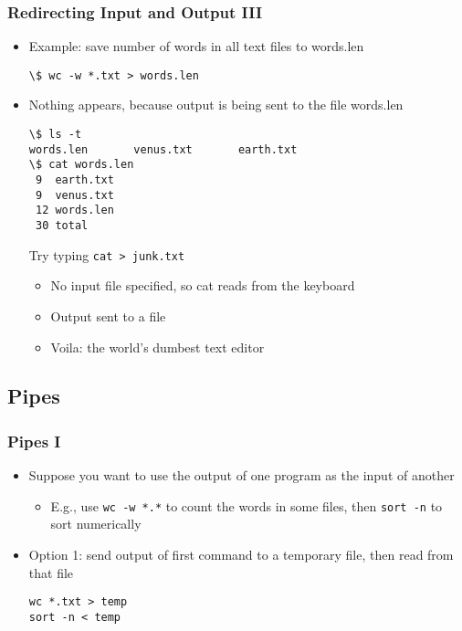 \begin{frame}[fragile]\frametitle{Redirecting Input and Output III}
\begin{itemize}
\item Example: save number of words in all text files to words.len
\codesmall
\codelist
\begin{lstlisting}[linewidth=5cm]
\$ wc -w *.txt > words.len
\end{lstlisting}
\item Nothing appears, because output is being sent to the file words.len
\reslist
\begin{lstlisting}[linewidth=5cm]
\$ ls -t
words.len       venus.txt       earth.txt
\$ cat words.len
 9  earth.txt
 9  venus.txt
 12 words.len
 30 total
\end{lstlisting}
\codenormal
Try typing \lstinline!cat > junk.txt!
\begin{itemize}
    \item No input file specified, so cat reads from the keyboard
    \item Output sent to a file
    \item Voila: the world's dumbest text editor
\end{itemize}
\end{itemize}
\end{frame}

\subsection{Pipes}

\begin{frame}[fragile]\frametitle{Pipes I}
\begin{itemize}
\item Suppose you want to use the output of one program as the input of another
\begin{itemize}
    \item E.g., use \lstinline!wc -w *.*! to count the words in some files, then \lstinline!sort -n! to sort numerically
\end{itemize}
\item Option 1: send output of first command to a temporary file, then read from that file
\codelist
\begin{lstlisting}[linewidth=5cm]
wc *.txt > temp
sort -n < temp
\end{lstlisting}
\end{itemize}
\end{frame}



